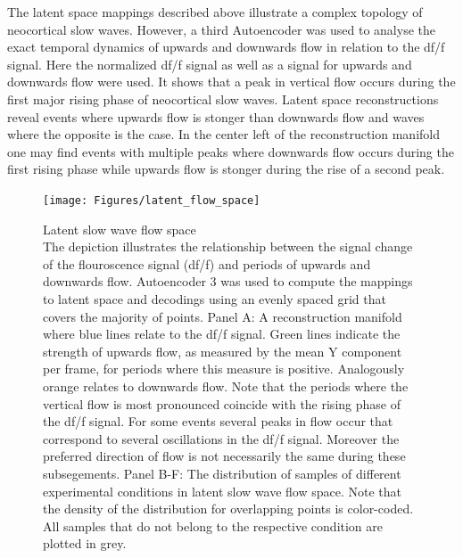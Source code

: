 The latent space mappings described above illustrate a complex topology of neocortical slow waves. However, a third Autoencoder was used to analyse the exact temporal dynamics of upwards and downwards flow in relation to the df/f signal. Here the normalized df/f signal as well as a signal for upwards and downwards flow were used. It shows that a peak in vertical flow occurs during the first major rising phase of neocortical slow waves. Latent space reconstructions reveal events where upwards flow is stonger than downwards flow and waves where the opposite is the case. In the center left of the reconstruction manifold one may find events with multiple peaks where downwards flow occurs during the first rising phase while upwards flow is stonger during the rise of a second peak.\\

\begin{figure}[!htb]
\centering
\texttt{[image: Figures/latent\_flow\_space]}
\decoRule
\caption[Latent slow wave flow space]{Latent slow wave flow space\\ The depiction illustrates the relationship between the signal change of the flouroscence signal (df/f) and periods of upwards and downwards flow. Autoencoder 3 was used to compute the mappings to latent space and decodings using an evenly spaced grid that covers the majority of points. Panel A: A reconstruction manifold where blue lines relate to the df/f signal. Green lines indicate the strength of upwards flow, as measured by the mean Y component per frame, for periods where this measure is positive. Analogously orange relates to downwards flow. Note that the periods where the vertical flow is most pronounced coincide with the rising phase of the df/f signal. For some events several peaks in flow occur that correspond to several oscillations in the df/f signal. Moreover the preferred direction of flow is not necessarily the same during these subsegements. Panel B-F: The distribution of samples of different experimental conditions in latent slow wave flow space. Note that the density of the distribution for overlapping points is color-coded. All samples that do not belong to the respective condition are plotted in grey.}
\label{fig:latent_flow_space}
\end{figure}
